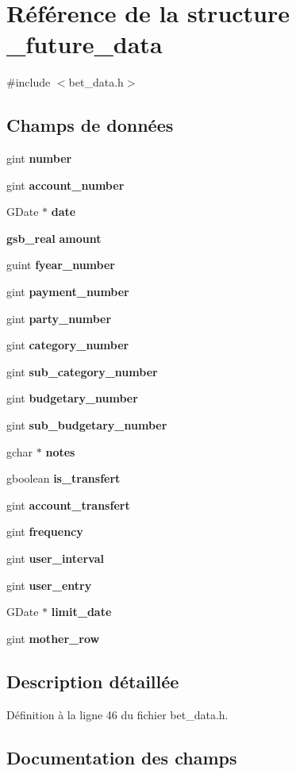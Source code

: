 \section{Référence de la structure \_\-future\_\-data}
\label{struct__future__data}


{\ttfamily \#include $<$bet\_\-data.h$>$}

\subsection*{Champs de données}
\begin{DoxyCompactItemize}
\item 
gint {\bf number}
\item 
gint {\bf account\_\-number}
\item 
GDate $\ast$ {\bf date}
\item 
{\bf gsb\_\-real} {\bf amount}
\item 
guint {\bf fyear\_\-number}
\item 
gint {\bf payment\_\-number}
\item 
gint {\bf party\_\-number}
\item 
gint {\bf category\_\-number}
\item 
gint {\bf sub\_\-category\_\-number}
\item 
gint {\bf budgetary\_\-number}
\item 
gint {\bf sub\_\-budgetary\_\-number}
\item 
gchar $\ast$ {\bf notes}
\item 
gboolean {\bf is\_\-transfert}
\item 
gint {\bf account\_\-transfert}
\item 
gint {\bf frequency}
\item 
gint {\bf user\_\-interval}
\item 
gint {\bf user\_\-entry}
\item 
GDate $\ast$ {\bf limit\_\-date}
\item 
gint {\bf mother\_\-row}
\end{DoxyCompactItemize}


\subsection{Description détaillée}


Définition à la ligne 46 du fichier bet\_\-data.h.



\subsection{Documentation des champs}
